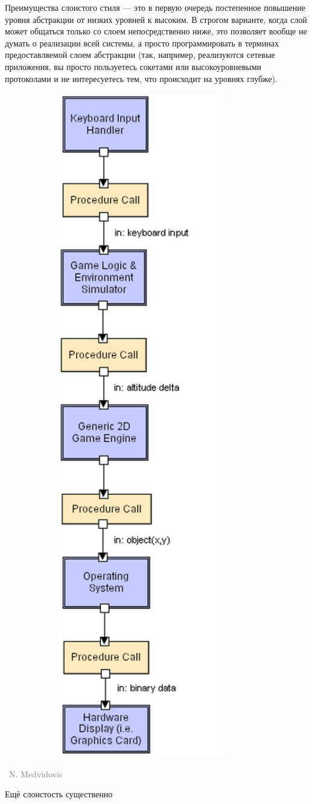 \documentclass[a5paper]{article}
\newlength\Colsep
\newcommand{\attribution}[1] {
    \vspace{-4mm}\begin{flushright}\begin{scriptsize}\textcolor{gray}
    {\textcopyright\, #1}\end{scriptsize}\end{flushright}
}
\begin{document}
\begin{minipage}{\textwidth}
\begin{minipage}[c][10cm][c]{\dimexpr0.8\textwidth-0.5\Colsep\relax}
        Преимущества слоистого стиля --- это в первую очередь постепенное повышение уровня абстракции от низких уровней к высоким. В строгом варианте, когда слой может общаться только со слоем непосредственно ниже, это позволяет вообще не думать о  реализации всей системы, а просто программировать в терминах предоставляемой слоем абстракции (так, например, реализуются сетевые приложения, вы просто пользуетесь сокетами или высокоуровневыми протоколами и не интересуетесь тем, что происходит на уровнях глубже).
    \end{minipage}\hfill
    \begin{minipage}[c][10cm][c]{\dimexpr0.2\textwidth-0.5\Colsep\relax}
        \includegraphics[width=0.9\textwidth]{layeredLL.png}
        \attribution{N. Medvidovic}
    \end{minipage}%
\end{minipage}

Ещё слоистость существенно
\end{document}
